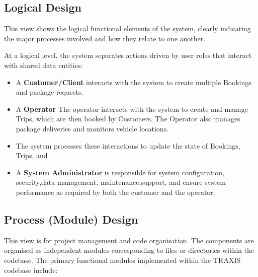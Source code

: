\subsection{Logical Design}

This view shows the logical functional elements of the system, clearly
indicating the major processes involved and how they relate to one another.



At a logical level, the system separates actions driven by user roles that
interact with shared data entities:



\begin{itemize}

 \item A \textbf{Customer/Client} interacts with the system to create
multiple Bookings and package requests.

 \item A \textbf{Operator} The operator interacts with the system to
create and manage Trips, which are then booked by Customers. The Operator also
manages package deliveries and monitors vehicle locations.

 \item The system processes these interactions to update the state of
Bookings, Trips, and

 \item A \textbf{System Administrator} is responsible for system
configuration, security,data management, maintenance,support, and ensure system
performance as required by both the customer and the operator.

\end{itemize}

\subsection{Process (Module) Design}

This view is for project management and code organisation. The components are
organised as independent modules corresponding to files or directories within
the codebase. The primary functional modules implemented within the TRAXIS
codebase include:



